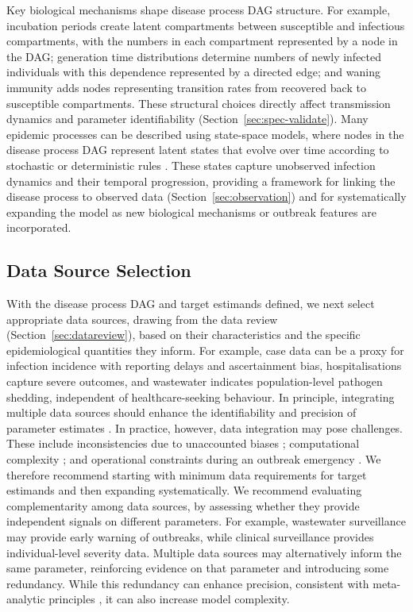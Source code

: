 \documentclass{article}
\begin{document}
Key biological mechanisms shape disease process DAG structure. For example, incubation periods create latent compartments between susceptible and infectious compartments, with the numbers in each compartment represented by a node in the DAG; generation time distributions determine numbers of newly infected individuals with this dependence represented by a directed edge; and waning immunity adds nodes representing transition rates from recovered back to susceptible compartments.
 These structural choices directly affect transmission dynamics and parameter identifiability (Section~\ref{sec:spec-validate}). Many epidemic processes can be described using state-space models, where nodes in the disease process DAG represent latent states that evolve over time according to stochastic or deterministic rules \citep{birrell2018evidence}. These states capture unobserved infection dynamics and their temporal progression, providing a framework for linking the disease process to observed data (Section~\ref{sec:observation}) and for systematically expanding the model as new biological mechanisms or outbreak features are incorporated.

\subsection{Data Source Selection} \label{sec:data-selection}

With the disease process DAG and target estimands defined, we next select appropriate data sources, drawing from the data review (Section~\ref{sec:datareview}), based on their characteristics and the specific epidemiological quantities they inform.
For example, case data can be a proxy for infection incidence with reporting delays and ascertainment bias, hospitalisations capture severe outcomes, and wastewater indicates population-level pathogen shedding, independent of healthcare-seeking behaviour.
In principle, integrating multiple data sources should enhance the identifiability and precision of parameter estimates \citep{deangelis2018analysing, lison2024generative, russell2024combined, birrell2025real}. In practice, however, data integration may pose challenges. 
These include inconsistencies due to unaccounted biases \citep{presanis2013conflict,knock2021key, Ward2024-sp, corbella2022inferring}; computational complexity \citep{corbella2022inferring}; and operational constraints during an outbreak emergency \citep{mccaw2023role}.
We therefore recommend starting with minimum data requirements for target estimands and then expanding systematically. 
We recommend evaluating complementarity among data sources, by assessing whether they provide independent signals on different parameters. For example, wastewater surveillance may provide early warning of outbreaks, while clinical surveillance provides individual-level severity data. Multiple data sources may alternatively inform the same parameter, reinforcing evidence on that parameter and introducing some redundancy. While this redundancy can enhance precision, consistent with meta-analytic principles \citep{deangelis2018analysing,borenstein2021introduction}, it can also increase model complexity.
\end{document}
